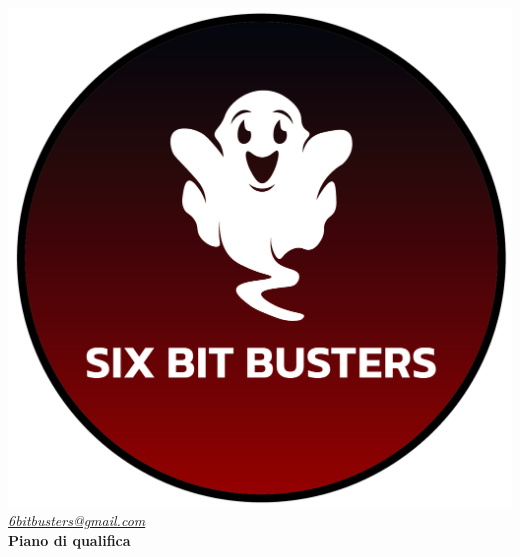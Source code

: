 \thispagestyle{empty}
\renewcommand{\arraystretch}{1.3}


\begin{titlepage}
	\begin{center}
		
	\includegraphics[scale = 0.6]{template/images/logo-circle.png}
	\\[0.6cm]
	\href{mailto:6bitbusters@gmail.com}		      	
	{\large{\textit{6bitbusters@gmail.com} } }\\[0.3cm]
	
	\Huge \textbf{Piano di qualifica} \\[0.5cm]


\end{center}
\end{titlepage}
